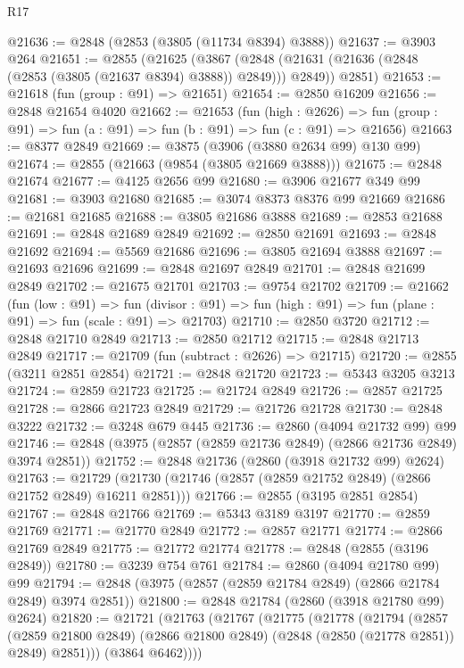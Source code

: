 \begin{lexlean}{R17}
\begin{coremodule}
@21636 := @2848 (@2853 (@3805 (@11734 @8394) @3888))
@21637 := @3903 @264
@21651 := @2855
    (@21625
      (@3867 (@2848 (@21631 (@21636 (@2848 (@2853 (@3805 (@21637 @8394) @3888)) @2849))) @2849))
      @2851)
@21653 := @21618 (fun (group : @91) => @21651)
@21654 := @2850 @16209
@21656 := @2848 @21654 @4020
@21662 := @21653
    (fun (high : @2626) =>
    fun (group : @91) => fun (a : @91) => fun (b : @91) => fun (c : @91) => @21656)
@21663 := @8377 @2849
@21669 := @3875 (@3906 (@3880 @2634 @99) @130 @99)
@21674 := @2855 (@21663 (@9854 (@3805 @21669 @3888)))
@21675 := @2848 @21674
@21677 := @4125 @2656 @99
@21680 := @3906 @21677 @349 @99
@21681 := @3903 @21680
@21685 := @3074 @8373 @8376 @99 @21669
@21686 := @21681 @21685
@21688 := @3805 @21686 @3888
@21689 := @2853 @21688
@21691 := @2848 @21689 @2849
@21692 := @2850 @21691
@21693 := @2848 @21692
@21694 := @5569 @21686
@21696 := @3805 @21694 @3888
@21697 := @21693 @21696
@21699 := @2848 @21697 @2849
@21701 := @2848 @21699 @2849
@21702 := @21675 @21701
@21703 := @9754 @21702
@21709 := @21662
    (fun (low : @91) =>
    fun (divisor : @91) => fun (high : @91) => fun (plane : @91) => fun (scale : @91) => @21703)
@21710 := @2850 @3720
@21712 := @2848 @21710 @2849
@21713 := @2850 @21712
@21715 := @2848 @21713 @2849
@21717 := @21709 (fun (subtract : @2626) => @21715)
@21720 := @2855 (@3211 @2851 @2854)
@21721 := @2848 @21720
@21723 := @5343 @3205 @3213
@21724 := @2859 @21723
@21725 := @21724 @2849
@21726 := @2857 @21725
@21728 := @2866 @21723 @2849
@21729 := @21726 @21728
@21730 := @2848 @3222
@21732 := @3248 @679 @445
@21736 := @2860 (@4094 @21732 @99) @99
@21746 := @2848 (@3975 (@2857 (@2859 @21736 @2849) (@2866 @21736 @2849) @3974 @2851))
@21752 := @2848 @21736 (@2860 (@3918 @21732 @99) @2624)
@21763 := @21729 (@21730 (@21746 (@2857 (@2859 @21752 @2849) (@2866 @21752 @2849) @16211 @2851)))
@21766 := @2855 (@3195 @2851 @2854)
@21767 := @2848 @21766
@21769 := @5343 @3189 @3197
@21770 := @2859 @21769
@21771 := @21770 @2849
@21772 := @2857 @21771
@21774 := @2866 @21769 @2849
@21775 := @21772 @21774
@21778 := @2848 (@2855 (@3196 @2849))
@21780 := @3239 @754 @761
@21784 := @2860 (@4094 @21780 @99) @99
@21794 := @2848 (@3975 (@2857 (@2859 @21784 @2849) (@2866 @21784 @2849) @3974 @2851))
@21800 := @2848 @21784 (@2860 (@3918 @21780 @99) @2624)
@21820 := @21721
    (@21763
      (@21767
        (@21775
          (@21778
            (@21794
              (@2857
                (@2859 @21800 @2849)
                (@2866 @21800 @2849)
                (@2848 (@2850 (@21778 @2851)) @2849)
                @2851)))
          (@3864 @6462))))

\end{coremodule}
\end{lexlean}
